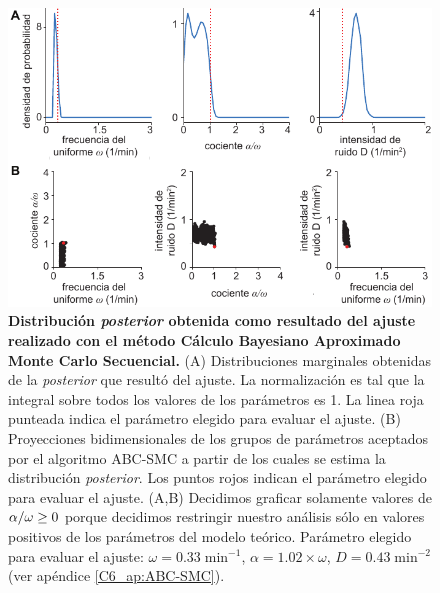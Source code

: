 \documentclass[./main.tex]{subfiles}
\begin{document}
\begin{figure}
    \centering
    \includegraphics[width=1\columnwidth]{figures/chapter6/C6_fit_refval.pdf} 
    \caption{\textbf{Distribución \textit{posterior} obtenida como resultado del ajuste realizado con el método Cálculo Bayesiano Aproximado Monte Carlo Secuencial.} (A) Distribuciones marginales obtenidas de la \textit{posterior} que resultó del ajuste. La normalización es tal que la integral sobre todos los valores de los parámetros es 1. La linea roja punteada indica el parámetro elegido para evaluar el ajuste. (B) Proyecciones bidimensionales de los grupos de parámetros aceptados por el algoritmo ABC-SMC a partir de los cuales se estima la distribución \textit{posterior}. Los puntos rojos indican el parámetro elegido para evaluar el ajuste. (A,B) Decidimos graficar solamente valores de $\alpha/\omega \geq 0$ porque decidimos restringir nuestro análisis sólo en valores positivos de los parámetros del modelo teórico. Parámetro elegido para evaluar el ajuste: $\omega = 0.33 \;\text{min}^{-1}$, $\alpha = 1.02 \times \omega$, $ D = 0.43 \; \text{min}^{-2}$ (ver apéndice \ref{C6_ap:ABC-SMC}).}
    \label{C6_fig:fit}
\end{figure} 
\end{document}
